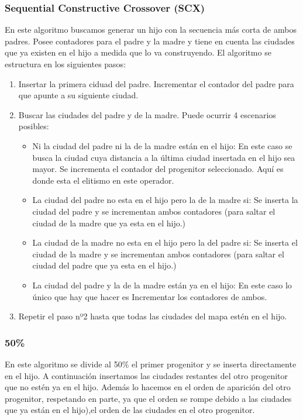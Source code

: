 \documentclass{article}
\begin{document}
\subsubsection{Sequential Constructive Crossover (SCX)}
En este algoritmo buscamos generar un hijo con la secuencia más corta de ambos padres. Posee contadores para el padre y la madre 
y tiene en cuenta las ciudades que ya existen en el hijo a medida que lo va construyendo. El algoritmo se estructura en los 
siguientes pasos:
\begin{enumerate}
    \item Insertar la primera ciduad del padre. Incrementar el contador del padre para que apunte a su siguiente ciudad. 
    \item Buscar las ciudades del padre y de la madre. Puede ocurrir 4 escenarios posibles:
        \begin{itemize}
            \item Ni la ciudad del padre ni la de la madre están en el hijo: En este caso se busca la ciudad cuya distancia 
            a la última ciudad insertada en el hijo sea mayor. Se incrementa el contador del progenitor seleccionado. Aquí es donde 
            esta el elitismo en este operador. 
            \item La ciudad del padre no esta en el hijo pero la de la madre si: Se inserta la ciudad  del padre y se incrementan 
            ambos contadores (para saltar el ciudad de la madre que ya esta en el hijo.)
            \item La ciudad de la madre no esta en el hijo pero la del padre si: Se inserta el ciudad de la madre y se incrementan 
            ambos contadores (para saltar el ciudad del padre que ya esta en el hijo.)
            \item La ciudad del padre y la de la madre están ya en el hijo: En este caso lo único que hay que hacer es Incrementar
            los contadores de ambos. %
        \end{itemize}
    
    \item Repetir el paso nº2 hasta que todas las ciudades del mapa estén en el hijo. 
\end{enumerate}

\subsubsection{50\%}
En este algoritmo se divide al 50\% el primer progenitor y se inserta directamente en el hijo. A continuación insertamos 
las ciudades restantes del otro progenitor que no estén ya en el hijo. Además lo hacemos en el orden de aparición del otro 
progenitor, respetando en parte, ya que el orden se rompe debido a las ciudades que ya están en el hijo),el orden de las ciudades 
en el otro progenitor.  
\end{document}

